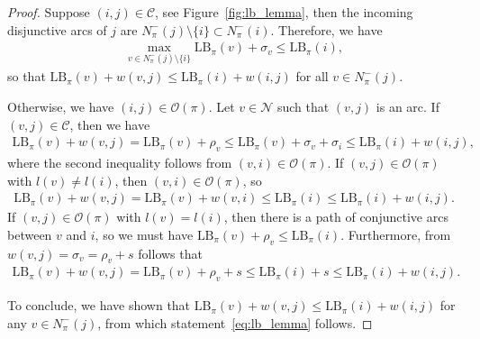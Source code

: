 \documentclass[a4paper]{article}
\theoremstyle{definition}
\theoremstyle{plain}
\begin{document}
\begin{proof}
  Suppose $(i,j) \in \mathcal{C}$, see Figure~\ref{fig:lb_lemma},
  then the incoming disjunctive arcs of $j$ are
  $N^{-}_{\pi}(j) \setminus \{ i \} \subset N^{-}_{\pi}(i)$. Therefore, we have
  \begin{align*}
    \max_{v \in N^{-}_{\pi}(j) \setminus \{i\}} \text{LB}_\pi(v) + \sigma_{v} \leq \text{LB}_\pi(i) ,
  \end{align*}
  so that
      $\text{LB}_\pi(v) + w(v,j) \leq \text{LB}_\pi(i) + w(i,j)$
  for all $v \in N_{\pi}^{-}(j)$.

  Otherwise, we have $(i, j) \in \mathcal{O}(\pi)$.
  Let $v \in \mathcal{N}$ such that $(v, j)$ is an arc.
  If $(v,j) \in \mathcal{C}$, then we have
  \begin{align*}
    \text{LB}_\pi(v) + w(v,j) =
    \text{LB}_\pi(v) + \rho_{v} \leq \text{LB}_\pi(v) + \sigma_{v} + \sigma_{i} \leq \text{LB}_\pi(i) + w(i,j) ,
  \end{align*}
  where the second inequality follows from $(v,i) \in \mathcal{O}(\pi)$.
  If $(v, j) \in \mathcal{O}(\pi)$ with $l(v) \neq l(i)$, then $(v,i) \in \mathcal{O}(\pi)$, so
  \begin{align*}
    \text{LB}_\pi(v) + w(v, j) = \text{LB}_\pi(v) + w(v, i) \leq \text{LB}_\pi(i) \leq \text{LB}_\pi(i) + w(i,j) .
  \end{align*}
  If $(v, j) \in \mathcal{O}(\pi)$ with $l(v) = l(i)$, then there is a path of conjunctive arcs between $v$ and
  $i$, so we must have $\text{LB}_\pi(v) + \rho_{v} \leq \text{LB}_\pi(i)$.
  Furthermore, from $w(v,j) = \sigma_{v} = \rho_{v} + s$ follows that
  \begin{align*}
    \text{LB}_\pi(v) + w(v,j) = \text{LB}_\pi(v) + \rho_{v} + s \leq \text{LB}_\pi(i) + s \leq \text{LB}_\pi(i) + w(i, j) .
  \end{align*}

  To conclude, we have shown that
  $\text{LB}_\pi(v) + w(v,j) \leq \text{LB}_\pi(i) + w(i,j)$ for any
  $v \in N^{-}_{\pi}(j)$, from which statement~\eqref{eq:lb_lemma} follows.
\end{proof}
\end{document}
